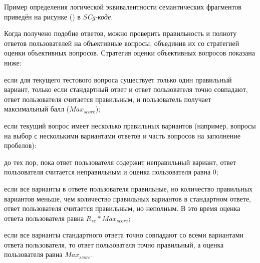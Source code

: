 Пример определения логической эквивалентности семантических фрагментов приведён на рисунке (\textit{}) в \textit{SCg-коде}. 

Когда получено подобие ответов, можно проверить правильность и полноту ответов пользователей на объективные вопросы, объединив их со стратегией оценки объективных вопросов. Стратегия оценки объективных вопросов показана ниже:

\begin{textitemize}
	\item если для текущего тестового вопроса существует только один правильный вариант, только если стандартный ответ и ответ пользователя точно совпадают, ответ пользователя считается правильным, и пользователь получает максимальный балл ($Max_{score}$);
	
	\item если текущий вопрос имеет несколько правильных вариантов (например, вопросы на выбор с несколькими вариантами ответов и часть вопросов на заполнение пробелов):
	
	\begin{textitemize}
		\item до тех пор, пока ответ пользователя содержит неправильный вариант, ответ пользователя считается неправильным и оценка пользователя равна 0;
		
		\item если все варианты в ответе пользователя правильные, но количество правильных вариантов меньше, чем количество правильных вариантов в стандартном ответе, ответ пользователя считается правильным, но неполным. В это время оценка ответа пользователя равна $R_{sc}*Max_{score}$;
		
		\item если все варианты стандартного ответа точно совпадают со всеми вариантами ответа пользователя, то ответ пользователя точно правильный, а оценка пользователя равна $Max_{score}$. 	
		
	\end{textitemize}
	
\end{textitemize}

